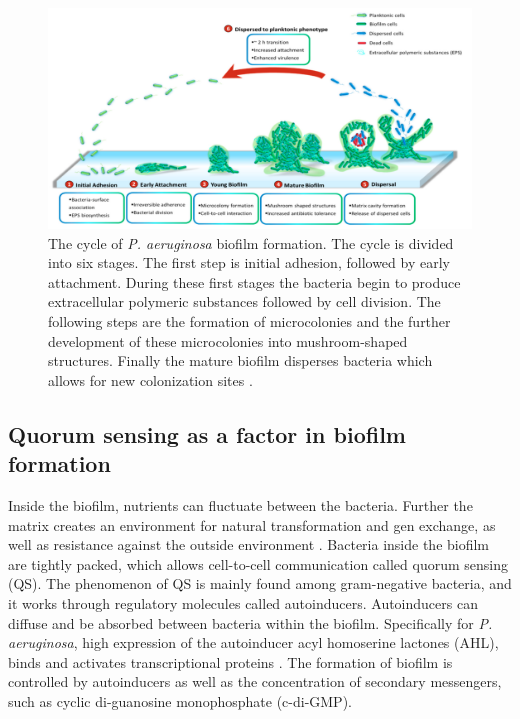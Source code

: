 \begin{figure}[H]
    \centering
    \includegraphics[width=\textwidth]{Figures/Screenshot 2022-04-27 at 10.00.54.png}
    \caption{\footnotesize{The cycle of \textit{P. aeruginosa} biofilm formation. The cycle is divided into six stages. The first step is initial adhesion, followed by early attachment. During these first stages the bacteria begin to produce extracellular polymeric substances followed by cell division. The following steps are the formation of microcolonies and the further development of these microcolonies into mushroom-shaped structures. Finally the mature biofilm disperses bacteria which allows for new colonization sites \cite{Thi2020PseudomonasBiofilms}.}}
    \label{fig:biofilm}
\end{figure}

\subsection{Quorum sensing as a factor in biofilm formation}

\noindent Inside the biofilm, nutrients can fluctuate between the bacteria. Further the matrix creates an environment for natural transformation and gen exchange, as well as resistance against the outside environment \cite{Madigan2022BrockMicroorganisms}. Bacteria inside the biofilm are tightly packed, which allows cell-to-cell communication called quorum sensing (QS). The phenomenon of QS is mainly found among gram-negative bacteria, and it works through regulatory molecules called autoinducers. Autoinducers can diffuse and be absorbed between bacteria within the biofilm. Specifically for \textit{P. aeruginosa}, high expression of the autoinducer acyl homoserine lactones (AHL), binds and activates transcriptional proteins \cite{Madigan2022BrockMicroorganisms}. The formation of biofilm is controlled by autoinducers as well as the concentration of secondary messengers, such as cyclic di-guanosine monophosphate (c-di-GMP). \\

